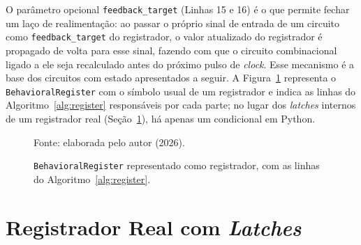 O parâmetro opcional \texttt{feedback\_target} (Linhas 15 e 16) é o que permite fechar um laço de realimentação: ao passar o próprio sinal de entrada de um circuito como \texttt{feedback\_target} do registrador, o valor atualizado do registrador é propagado de volta para esse sinal, fazendo com que o circuito combinacional ligado a ele seja recalculado antes do próximo pulso de \textit{clock}. Esse mecanismo é a base dos circuitos com estado apresentados a seguir. A Figura~\ref{fig:behavioral-register} representa o \texttt{BehavioralRegister} com o símbolo usual de um registrador e indica as linhas do Algoritmo~\ref{alg:register} responsáveis por cada parte; no lugar dos \textit{latches} internos de um registrador real (Seção~\ref{sec:latches}), há apenas um condicional em Python.

\begin{figure}[H]
\centering
\caption{\texttt{BehavioralRegister} representado como registrador, com as linhas do Algoritmo~\ref{alg:register}.}
\label{fig:behavioral-register}
\begin{center}
\footnotesize Fonte: elaborada pelo autor (2026).
\end{center}
\end{figure}

\section{Registrador Real com \textit{Latches}}
\label{sec:latches}

